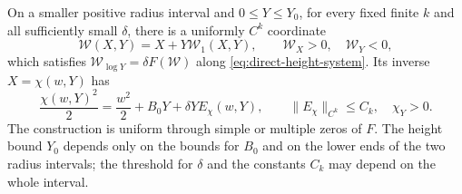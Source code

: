 \begin{lemma}
\label{lem:direct-boundary-flow}
On a smaller positive radius interval and \(0\le Y\le Y_0\),
for every fixed finite \(k\) and all sufficiently small \(\delta\),
there is a uniformly \(C^k\) coordinate
\[
 \mathcal W(X,Y)=X+Y\mathcal W_1(X,Y),\qquad
 \mathcal W_X>0,\quad \mathcal W_Y<0,
\]
which satisfies \(\mathcal W_{\log Y}=\delta F(\mathcal W)\) along
\eqref{eq:direct-height-system}. Its inverse \(X=\chi(w,Y)\)
has
\begin{equation}
\label{eq:direct-projection-energy}
 \frac{\chi(w,Y)^2}{2}
   =\frac{w^2}{2}+B_0Y+\delta YE_\chi(w,Y),\qquad
 \|E_\chi\|_{C^k}\le C_k,\quad \chi_Y>0.
\end{equation}
The construction is uniform through simple or multiple zeros of \(F\).
The height bound \(Y_0\) depends only on the bounds for \(B_0\) and on the
lower ends of the two radius intervals; the threshold for \(\delta\) and
the constants \(C_k\) may depend on the whole interval.
\end{lemma}

